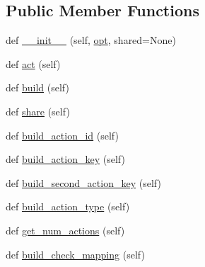 \subsection*{Public Member Functions}
\begin{DoxyCompactItemize}
\item 
def \hyperlink{classprojects_1_1mastering__the__dungeon_1_1agents_1_1graph__world2_1_1agents_1_1DataAgentBase_a101fce933f4b780c5c7db5a491bc8250}{\+\_\+\+\_\+init\+\_\+\+\_\+} (self, \hyperlink{classparlai_1_1core_1_1agents_1_1Agent_ab3b45d2754244608c75d4068b90cd051}{opt}, shared=None)
\item 
def \hyperlink{classprojects_1_1mastering__the__dungeon_1_1agents_1_1graph__world2_1_1agents_1_1DataAgentBase_ad6f83f744da85fbbb716caea0f5c5437}{act} (self)
\item 
def \hyperlink{classprojects_1_1mastering__the__dungeon_1_1agents_1_1graph__world2_1_1agents_1_1DataAgentBase_aaf20408d968ec3dbd7e2c9216f13a926}{build} (self)
\item 
def \hyperlink{classprojects_1_1mastering__the__dungeon_1_1agents_1_1graph__world2_1_1agents_1_1DataAgentBase_a7f1cc8296cd80799cb24984960ea3ce8}{share} (self)
\item 
def \hyperlink{classprojects_1_1mastering__the__dungeon_1_1agents_1_1graph__world2_1_1agents_1_1DataAgentBase_a830ec93c967867b414ec3ca4d0e66879}{build\+\_\+action\+\_\+id} (self)
\item 
def \hyperlink{classprojects_1_1mastering__the__dungeon_1_1agents_1_1graph__world2_1_1agents_1_1DataAgentBase_ab6689897f975fd851e417e062d2f2f75}{build\+\_\+action\+\_\+key} (self)
\item 
def \hyperlink{classprojects_1_1mastering__the__dungeon_1_1agents_1_1graph__world2_1_1agents_1_1DataAgentBase_ae9bff71865291c397ed4acce957c3234}{build\+\_\+second\+\_\+action\+\_\+key} (self)
\item 
def \hyperlink{classprojects_1_1mastering__the__dungeon_1_1agents_1_1graph__world2_1_1agents_1_1DataAgentBase_adbe7b4f659a2a39e8e6ec37bcd583d6f}{build\+\_\+action\+\_\+type} (self)
\item 
def \hyperlink{classprojects_1_1mastering__the__dungeon_1_1agents_1_1graph__world2_1_1agents_1_1DataAgentBase_a5b21ce4807ee5540c2a36534fdc91bd2}{get\+\_\+num\+\_\+actions} (self)
\item 
def \hyperlink{classprojects_1_1mastering__the__dungeon_1_1agents_1_1graph__world2_1_1agents_1_1DataAgentBase_a82b184af4dfd53b9d204bb57e980dd78}{build\+\_\+check\+\_\+mapping} (self)
\item 

\end{DoxyCompactItemize}
